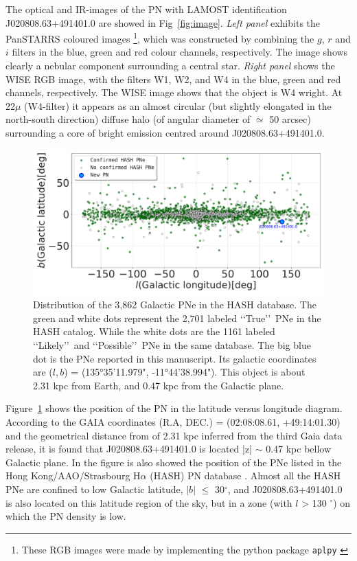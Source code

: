 \documentclass[fleqn,usenatbib]{mnras}
\begin{document}
The optical and IR-images of the PN with LAMOST
identification J020808.63+491401.0 are showed in Fig~\ref{fig:image}.
\textit{Left panel} exhibits the PanSTARRS coloured
images \footnote{These RGB images were made by implementing
the python package \texttt{aplpy} \citep{aplpy:2019}}, which
was constructed by combining the $g$, $r$ and $i$ filters in
the blue, green and red colour channels, respectively.
The image shows clearly a nebular component surrounding 
a central star. \textit{Right panel} shows the
WISE RGB image, with the filters W1, W2, and W4 in
the blue, green and red channels, respectively.
The WISE image shows that the object is W4 wright.  
At 22$\mu$ (W4-filter) it appears as an almost
circular (but slightly elongated in the north-south direction)
diffuse halo (of angular diameter of $\simeq$ 50 arcsec) surrounding
a core of bright emission centred around J020808.63+491401.0.

\begin{figure}
\centering
  \includegraphics[width=0.9\linewidth]{Figs/galctic-coord-pn.pdf}
  \caption{Distribution of the 3,862 Galactic PNe in the HASH database.
    The green and white dots represent the 2,701 labeled \lq\lq True\rq\rq~PNe in the HASH catalog.
    While the white dots are the 1161 labeled \lq\lq Likely\rq\rq~and \lq\lq Possible\rq\rq~PNe in
    the same database. The big blue dot is the PNe reported in this manuscript. Its galactic coordinates
    are ($l, b$) = (135°35'11.979", -11°44'38.994"). This object is about 2.31 kpc from
    Earth, and 0.47 kpc
from the Galactic plane.} 
  \label{fig:position}
\end{figure}

Figure~\ref{fig:position} shows the position of the PN in the latitude versus longitude
diagram.  According to the GAIA coordinates (R.A, DEC.) = (02:08:08.61, +49:14:01.30)
and the geometrical distance
from \citet{Bailer:2021} of 2.31 kpc inferred from the third Gaia data release,
it is found that J020808.63+491401.0 is located |z| $\sim$ 0.47 kpc bellow
Galactic plane. In the figure is also showed the position of the PNe listed in the
Hong Kong/AAO/Strasbourg H{$\alpha$} (HASH) PN database \citep{Parker:2016}. Almost all
the HASH PNe are confined to low Galactic latitude, $|b|$ $\leq$ 30$^{\circ}$, and
J020808.63+491401.0 is also located on this latitude region of the sky, but in a zone
(with $l$ > 130 $^{\circ}$) on which the PN density is low.
\end{document}
